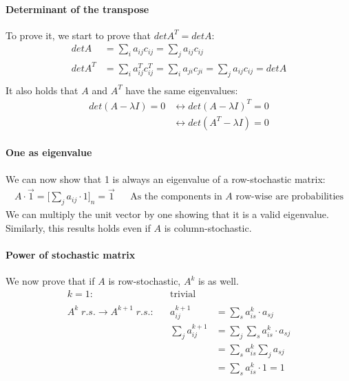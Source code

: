 \paragraph{Determinant of the transpose}
To prove it, we start to prove that $\mathit{det}A^T = \mathit{det}A$:
\begin{equation}
    \begin{aligned}
        \mathit{det}A &= \sum_i a_{ij} c_{ij} = \sum_j a_{ij} c_{ij}\\
        \mathit{det}A^T &= \sum_i a_{ij}^T c_{ij}^T = \sum_i a_{ji} c_{ji} = \sum_j a_{ij} c_{ij} = \mathit{det}A\\
    \end{aligned}
\end{equation}
It also holds that $A$ and $A^T$ have the same eigenvalues:
\begin{equation}
    \begin{aligned}
        \mathit{det}(A-\lambda I) = 0 &\longleftrightarrow \mathit{det}(A-\lambda I)^T = 0\\
        &\longleftrightarrow \mathit{det}(A^T-\lambda I) = 0
    \end{aligned}
\end{equation}

\paragraph{One as eigenvalue}
We can now show that 1 is always an eigenvalue of a row-stochastic matrix: 
\begin{equation}
    \begin{aligned}
        A\cdot \vec{1} = \biggr[\sum_j a_{ij}\cdot1\biggr]_n = \vec{1} && \text{As the components in $A$ row-wise are probabilities}
    \end{aligned}
\end{equation}
We can multiply the unit vector by one showing that it is a valid eigenvalue.
Similarly, this results holds even if $A$ is column-stochastic.

\paragraph{Power of stochastic matrix}
We now prove that if $A$ is row-stochastic, $A^k$ is as well.
\begin{equation}
    \begin{aligned}
        k=1:&& \text{trivial}\\\\
        A^k\;r.s. \rightarrow A^{k+1}\;r.s. : && a_{ij}^{k+1} &= 
        \sum_s a_{is}^k \cdot a_{sj}\\
        && \sum_j a_{ij}^{k+1} &= \sum_j
        \sum_s a_{is}^k \cdot a_{sj}\\
        && &= \sum_s a_{is}^k \sum_j a_{sj}\\
        && &= \sum_s a_{is}^k \cdot 1 = 1
    \end{aligned}
\end{equation}

